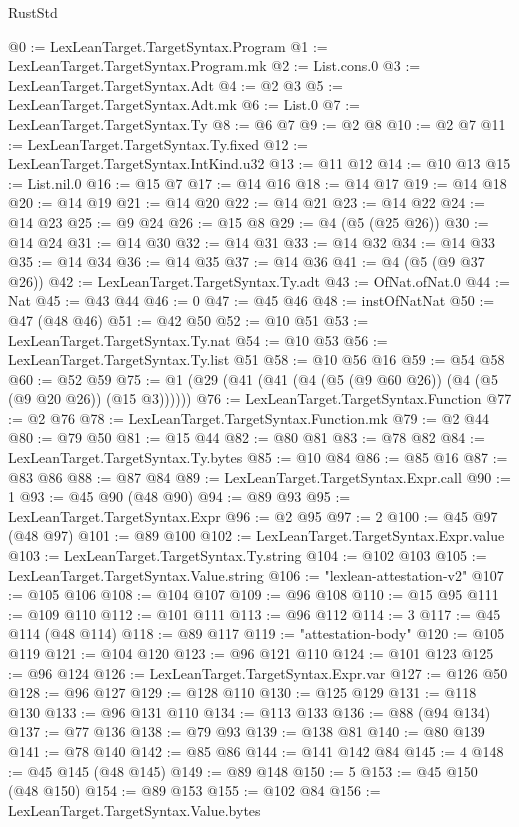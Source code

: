 \begin{lexlean}{RustStd}
\begin{coremodule}
@0 := LexLeanTarget.TargetSyntax.Program
@1 := LexLeanTarget.TargetSyntax.Program.mk
@2 := List.cons.{0}
@3 := LexLeanTarget.TargetSyntax.Adt
@4 := @2 @3
@5 := LexLeanTarget.TargetSyntax.Adt.mk
@6 := List.{0}
@7 := LexLeanTarget.TargetSyntax.Ty
@8 := @6 @7
@9 := @2 @8
@10 := @2 @7
@11 := LexLeanTarget.TargetSyntax.Ty.fixed
@12 := LexLeanTarget.TargetSyntax.IntKind.u32
@13 := @11 @12
@14 := @10 @13
@15 := List.nil.{0}
@16 := @15 @7
@17 := @14 @16
@18 := @14 @17
@19 := @14 @18
@20 := @14 @19
@21 := @14 @20
@22 := @14 @21
@23 := @14 @22
@24 := @14 @23
@25 := @9 @24
@26 := @15 @8
@29 := @4 (@5 (@25 @26))
@30 := @14 @24
@31 := @14 @30
@32 := @14 @31
@33 := @14 @32
@34 := @14 @33
@35 := @14 @34
@36 := @14 @35
@37 := @14 @36
@41 := @4 (@5 (@9 @37 @26))
@42 := LexLeanTarget.TargetSyntax.Ty.adt
@43 := OfNat.ofNat.{0}
@44 := Nat
@45 := @43 @44
@46 := 0
@47 := @45 @46
@48 := instOfNatNat
@50 := @47 (@48 @46)
@51 := @42 @50
@52 := @10 @51
@53 := LexLeanTarget.TargetSyntax.Ty.nat
@54 := @10 @53
@56 := LexLeanTarget.TargetSyntax.Ty.list @51
@58 := @10 @56 @16
@59 := @54 @58
@60 := @52 @59
@75 := @1 (@29 (@41 (@41 (@4 (@5 (@9 @60 @26)) (@4 (@5 (@9 @20 @26)) (@15 @3))))))
@76 := LexLeanTarget.TargetSyntax.Function
@77 := @2 @76
@78 := LexLeanTarget.TargetSyntax.Function.mk
@79 := @2 @44
@80 := @79 @50
@81 := @15 @44
@82 := @80 @81
@83 := @78 @82
@84 := LexLeanTarget.TargetSyntax.Ty.bytes
@85 := @10 @84
@86 := @85 @16
@87 := @83 @86
@88 := @87 @84
@89 := LexLeanTarget.TargetSyntax.Expr.call
@90 := 1
@93 := @45 @90 (@48 @90)
@94 := @89 @93
@95 := LexLeanTarget.TargetSyntax.Expr
@96 := @2 @95
@97 := 2
@100 := @45 @97 (@48 @97)
@101 := @89 @100
@102 := LexLeanTarget.TargetSyntax.Expr.value
@103 := LexLeanTarget.TargetSyntax.Ty.string
@104 := @102 @103
@105 := LexLeanTarget.TargetSyntax.Value.string
@106 := "lexlean-attestation-v2"
@107 := @105 @106
@108 := @104 @107
@109 := @96 @108
@110 := @15 @95
@111 := @109 @110
@112 := @101 @111
@113 := @96 @112
@114 := 3
@117 := @45 @114 (@48 @114)
@118 := @89 @117
@119 := "attestation-body"
@120 := @105 @119
@121 := @104 @120
@123 := @96 @121 @110
@124 := @101 @123
@125 := @96 @124
@126 := LexLeanTarget.TargetSyntax.Expr.var
@127 := @126 @50
@128 := @96 @127
@129 := @128 @110
@130 := @125 @129
@131 := @118 @130
@133 := @96 @131 @110
@134 := @113 @133
@136 := @88 (@94 @134)
@137 := @77 @136
@138 := @79 @93
@139 := @138 @81
@140 := @80 @139
@141 := @78 @140
@142 := @85 @86
@144 := @141 @142 @84
@145 := 4
@148 := @45 @145 (@48 @145)
@149 := @89 @148
@150 := 5
@153 := @45 @150 (@48 @150)
@154 := @89 @153
@155 := @102 @84
@156 := LexLeanTarget.TargetSyntax.Value.bytes

\end{coremodule}
\end{lexlean}
